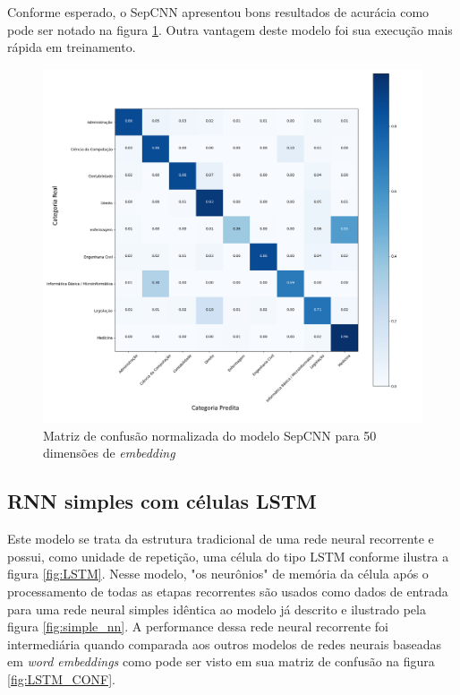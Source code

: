 Conforme esperado, o SepCNN apresentou bons resultados de acurácia como pode ser notado na figura \ref{fig:sepcnn_confusion}. Outra vantagem deste modelo foi sua execução mais rápida em treinamento.

\begin{figure}[!ht]
	\centering
	\includegraphics[width=1.1\textwidth]{figures/sepcnn_confusion.png}
	\caption{Matriz de confusão normalizada do modelo SepCNN para 50 dimensões de \textit{embedding}}
	\label{fig:sepcnn_confusion}
\end{figure}

\subsection{RNN simples com células LSTM} \label{section:RNN_simple}

Este modelo se trata da estrutura tradicional de uma rede neural recorrente e possui, como unidade de repetição, uma célula do tipo LSTM conforme ilustra a figura \ref{fig:LSTM}. Nesse modelo, "os neurônios" de memória da célula após o processamento de todas as etapas recorrentes são usados como dados de entrada para uma rede neural simples idêntica ao modelo já descrito e ilustrado pela figura \ref{fig:simple_nn}. A performance dessa rede neural recorrente foi intermediária quando comparada aos outros modelos de redes neurais baseadas em \textit{word embeddings} como pode ser visto em sua matriz de confusão na figura \ref{fig:LSTM_CONF}.

